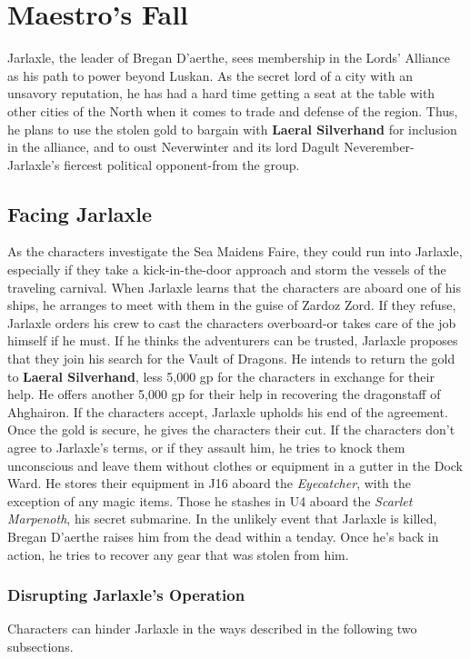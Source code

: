 \documentclass[10pt,a4paper,twoside,twocolumn,openany,nodeprecatedcode]{dndbook}
\begin{document}
\chapter{Maestro's Fall}
Jarlaxle, the leader of Bregan D'aerthe, sees membership in the Lords' Alliance as his path to power beyond Luskan. As the secret lord of a city with an unsavory reputation, he has had a hard time getting a seat at the table with other cities of the North when it comes to trade and defense of the region. Thus, he plans to use the stolen gold to bargain with \textbf{Laeral Silverhand} for inclusion in the alliance, and to oust Neverwinter and its lord Dagult Neverember-Jarlaxle's fiercest political opponent-from the group.
\section{Facing Jarlaxle}
As the characters investigate the Sea Maidens Faire, they could run into Jarlaxle, especially if they take a kick-in-the-door approach and storm the vessels of the traveling carnival. When Jarlaxle learns that the characters are aboard one of his ships, he arranges to meet with them in the guise of Zardoz Zord. If they refuse, Jarlaxle orders his crew to cast the characters overboard-or takes care of the job himself if he must.
If he thinks the adventurers can be trusted, Jarlaxle proposes that they join his search for the Vault of Dragons. He intends to return the gold to \textbf{Laeral Silverhand}, less 5,000 gp for the characters in exchange for their help. He offers another 5,000 gp for their help in recovering the dragonstaff of Ahghairon. If the characters accept, Jarlaxle upholds his end of the agreement. Once the gold is secure, he gives the characters their cut.
If the characters don't agree to Jarlaxle's terms, or if they assault him, he tries to knock them unconscious and leave them without clothes or equipment in a gutter in the Dock Ward. He stores their equipment in J16 aboard the \textit{Eyecatcher}, with the exception of any magic items. Those he stashes in U4 aboard the \textit{Scarlet Marpenoth}, his secret submarine.
In the unlikely event that Jarlaxle is killed, Bregan D'aerthe raises him from the dead within a tenday. Once he's back in action, he tries to recover any gear that was stolen from him.
\subsection{Disrupting Jarlaxle's Operation}
Characters can hinder Jarlaxle in the ways described in the following two subsections.
\end{document}
